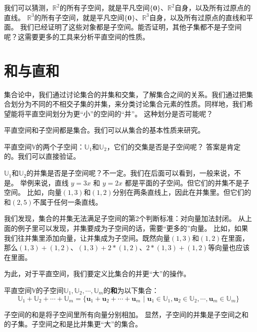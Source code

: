 \documentclass[12pt,UTF8,fontset=none]{ctexbook}
\begin{document}
我们可以猜测，$\mathbb{R}^2$的所有子空间，就是平凡空间$\{\mathbf{0}\}$、$\mathbb{R}^2$自身，以及所有过原点的直线。
$\mathbb{R}^3$的所有子空间，就是平凡空间$\{\mathbf{0}\}$、$\mathbb{R}^3$自身，以及所有过原点的直线和平面。
我们已经证明了这些对象都是子空间。能否证明，其他子集都不是子空间呢？这需要更多的工具来分析平直空间的性质。

\section{和与直和}
集合论中，我们通过讨论集合的并集和交集，了解集合之间的关系。我们通过把集合划分为不同的不相交子集的并集，来分类讨论集合元素的性质。同样地，我们希望能将平直空间划分为更“小”的空间的“并”。
这种划分是否可能呢？

平直空间和子空间都是集合。我们可以从集合的基本性质来研究。

平直空间$\mathbb{V}$的两个子空间：$\mathbb{U}_1$和$\mathbb{U}_2$，它们的交集是否是子空间呢？
答案是肯定的。我们可以直接验证。

$\mathbb{U}_1$和$\mathbb{U}_2$的并集是否是子空间呢？不一定。我们在后面可以看到，一般来说，不是。
举例来说，直线 $y = 3x$ 和 $y = 2x$ 都是平面的子空间。但它们的并集不是子空间。
比如，向量$(1,3)$和$(1,2)$分别在两条直线上，因此在并集里。但它们的和$(2,5)$不属于任何一条直线。

我们发现，集合的并集无法满足子空间的第2个判断标准：对向量加法封闭。
从上面的例子里可以发现，并集要成为子空间的话，需要“更多的”向量。
比如，如果我们往并集里添加向量，让并集成为子空间。既然向量$(1,3)$和$(1,2)$在里面，那么$(1,3)+(1,2)$、$(1,3)+2*(1,2)$、$2*(1,3)+(1,2)$等向量也应该在里面。

为此，对于平直空间，我们要定义比集合的并更“大”的操作。
\begin{df}\label{df:1_3}
    平直空间$\mathbb{V}$的子空间$\mathbb{U}_1, \mathbb{U}_2, \cdots , \mathbb{U}_m$的\textbf{和}为以下集合：\\
    $$ \mathbb{U}_1 + \mathbb{U}_2 + \cdots +\mathbb{U}_m = \{\mathbf{u}_1+\mathbf{u}_2+\cdots+\mathbf{u}_m \,\, | \,\, \mathbf{u}_1 \in \mathbb{U}_1, \mathbf{u}_2 \in \mathbb{U}_2, \cdots , \mathbf{u}_m \in \mathbb{U}_m \}$$
\end{df}

子空间的和是将子空间里所有向量分别相加。
显然，子空间的并集是子空间之和的子集。子空间之和是比并集更“大”的集合。
\end{document}
